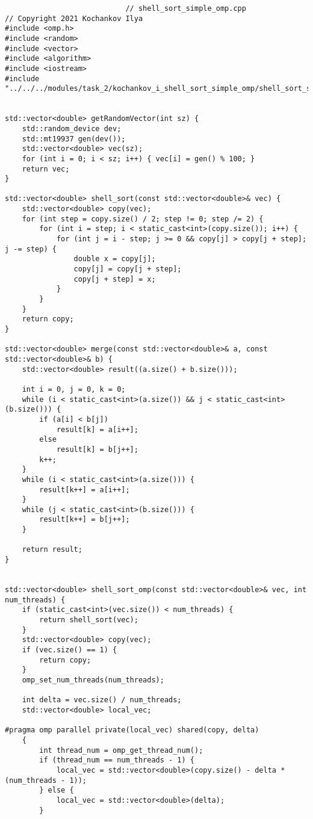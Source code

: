 \documentclass{report}
\begin{document}
\begin{lstlisting}
							// shell_sort_simple_omp.cpp
// Copyright 2021 Kochankov Ilya
#include <omp.h>
#include <random>
#include <vector>
#include <algorithm>
#include <iostream>
#include "../../../modules/task_2/kochankov_i_shell_sort_simple_omp/shell_sort_simple_omp.h"


std::vector<double> getRandomVector(int sz) {
    std::random_device dev;
    std::mt19937 gen(dev());
    std::vector<double> vec(sz);
    for (int i = 0; i < sz; i++) { vec[i] = gen() % 100; }
    return vec;
}

std::vector<double> shell_sort(const std::vector<double>& vec) {
    std::vector<double> copy(vec);
    for (int step = copy.size() / 2; step != 0; step /= 2) {
        for (int i = step; i < static_cast<int>(copy.size()); i++) {
            for (int j = i - step; j >= 0 && copy[j] > copy[j + step]; j -= step) {
                double x = copy[j];
                copy[j] = copy[j + step];
                copy[j + step] = x;
            }
        }
    }
    return copy;
}

std::vector<double> merge(const std::vector<double>& a, const std::vector<double>& b) {
    std::vector<double> result((a.size() + b.size()));

    int i = 0, j = 0, k = 0;
    while (i < static_cast<int>(a.size()) && j < static_cast<int>(b.size())) {
        if (a[i] < b[j])
            result[k] = a[i++];
        else
            result[k] = b[j++];
        k++;
    }
    while (i < static_cast<int>(a.size())) {
        result[k++] = a[i++];
    }
    while (j < static_cast<int>(b.size())) {
        result[k++] = b[j++];
    }

    return result;
}


std::vector<double> shell_sort_omp(const std::vector<double>& vec, int num_threads) {
    if (static_cast<int>(vec.size()) < num_threads) {
        return shell_sort(vec);
    }
    std::vector<double> copy(vec);
    if (vec.size() == 1) {
        return copy;
    }
    omp_set_num_threads(num_threads);

    int delta = vec.size() / num_threads;
    std::vector<double> local_vec;

#pragma omp parallel private(local_vec) shared(copy, delta)
    {
        int thread_num = omp_get_thread_num();
        if (thread_num == num_threads - 1) {
            local_vec = std::vector<double>(copy.size() - delta * (num_threads - 1));
        } else {
            local_vec = std::vector<double>(delta);
        }


\end{lstlisting}
\end{document}
